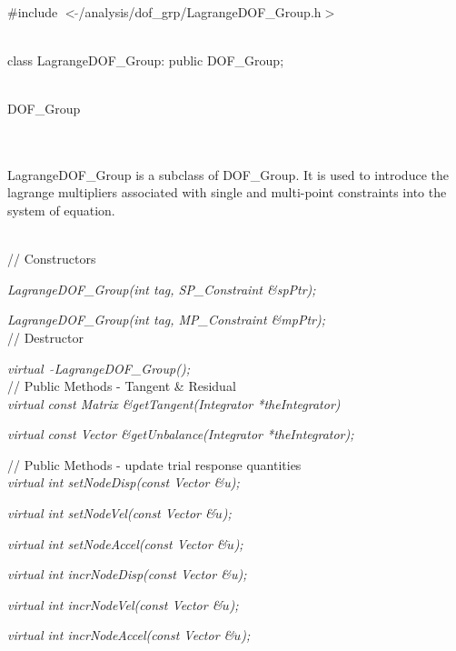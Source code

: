 
   \\
\#include $<\tilde{ }$/analysis/dof\_grp/LagrangeDOF\_Group.h$>$  


  \\
class LagrangeDOF\_Group: public DOF\_Group;  



  \\
DOF\_Group 

\indent{} \\ 

  \\
\indent LagrangeDOF\_Group is a subclass of DOF\_Group. It is used to
introduce the lagrange multipliers associated with single and
multi-point constraints into the system of equation.

  \\
// Constructors  

{\em LagrangeDOF\_Group(int tag, SP\_Constraint \&spPtr);}  

{\em LagrangeDOF\_Group(int tag, MP\_Constraint \&mpPtr);}  \\ 

// Destructor  

{\em virtual~ $\tilde{}$LagrangeDOF\_Group();}  \\

\indent // Public Methods - Tangent \& Residual  \\ 
{\em virtual const Matrix \&getTangent(Integrator *theIntegrator)} 

{\em virtual const Vector \&getUnbalance(Integrator *theIntegrator); }

\indent // Public Methods - update trial response quantities  \\ 
{\em virtual int setNodeDisp(const Vector \&u);} 

{\em virtual int setNodeVel(const Vector \&$\dot u$);}

{\em virtual int setNodeAccel(const Vector \&$\ddot u$);}

{\em virtual int incrNodeDisp(const Vector \&u);} 

{\em virtual int incrNodeVel(const Vector \&$\dot u$);}

{\em virtual int incrNodeAccel(const Vector \&$\ddot u$);}


